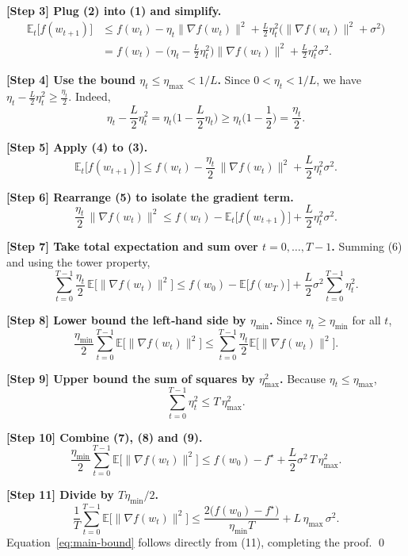 \documentclass[11pt]{article}
\begin{document}
\noindent\textbf{[Step 3] Plug (2) into (1) and simplify.}
\[
\begin{aligned}
\mathbb{E}_t\!\big[f(w_{t+1})\big]
&\le f(w_t)-\eta_t\|\nabla f(w_t)\|^2
   +\frac{L}{2}\eta_t^2\big(\|\nabla f(w_t)\|^2+\sigma^2\big)\\[4pt]
&= f(w_t)-\Big(\eta_t-\frac{L}{2}\eta_t^2\Big)\|\nabla f(w_t)\|^2
   +\frac{L}{2}\eta_t^2\sigma^2 .
\end{aligned}
\tag{3}
\]

\noindent\textbf{[Step 4] Use the bound $\eta_t\le\eta_{\max}<1/L$.}  
Since $0<\eta_t<1/L$, we have $\eta_t-\frac{L}{2}\eta_t^2\ge\frac{\eta_t}{2}$.
Indeed,
\[
\eta_t-\frac{L}{2}\eta_t^2
= \eta_t\Big(1-\frac{L}{2}\eta_t\Big)
\ge \eta_t\Big(1-\frac{1}{2}\Big)=\frac{\eta_t}{2}.
\tag{4}
\]

\noindent\textbf{[Step 5] Apply (4) to (3).}
\[
\mathbb{E}_t\!\big[f(w_{t+1})\big]
\le f(w_t)-\frac{\eta_t}{2}\,\|\nabla f(w_t)\|^2
   +\frac{L}{2}\eta_t^2\sigma^2 .
\tag{5}
\]

\noindent\textbf{[Step 6] Rearrange (5) to isolate the gradient term.}
\[
\frac{\eta_t}{2}\,\|\nabla f(w_t)\|^2
\le f(w_t)-\mathbb{E}_t\!\big[f(w_{t+1})\big]
   +\frac{L}{2}\eta_t^2\sigma^2 .
\tag{6}
\]

\noindent\textbf{[Step 7] Take total expectation and sum over $t=0,\dots,T-1$.}
Summing (6) and using the tower property,
\[
\sum_{t=0}^{T-1}\frac{\eta_t}{2}\,
\mathbb{E}\!\big[\|\nabla f(w_t)\|^2\big]
\le f(w_0)-\mathbb{E}\!\big[f(w_T)\big]
   +\frac{L}{2}\sigma^2\sum_{t=0}^{T-1}\eta_t^2 .
\tag{7}
\]

\noindent\textbf{[Step 8] Lower bound the left‑hand side by $\eta_{\min}$.}  
Since $\eta_t\ge\eta_{\min}$ for all $t$,
\[
\frac{\eta_{\min}}{2}\sum_{t=0}^{T-1}
\mathbb{E}\!\big[\|\nabla f(w_t)\|^2\big]
\le \sum_{t=0}^{T-1}\frac{\eta_t}{2}
\mathbb{E}\!\big[\|\nabla f(w_t)\|^2\big].
\tag{8}
\]

\noindent\textbf{[Step 9] Upper bound the sum of squares by $\eta_{\max}^2$.}
Because $\eta_t\le\eta_{\max}$,
\[
\sum_{t=0}^{T-1}\eta_t^2 \le T\,\eta_{\max}^2 .
\tag{9}
\]

\noindent\textbf{[Step 10] Combine (7), (8) and (9).}
\[
\frac{\eta_{\min}}{2}\sum_{t=0}^{T-1}
\mathbb{E}\!\big[\|\nabla f(w_t)\|^2\big]
\le f(w_0)-f^\star
   +\frac{L}{2}\sigma^2\,T\,\eta_{\max}^2 .
\tag{10}
\]

\noindent\textbf{[Step 11] Divide by $T\eta_{\min}/2$.}
\[
\frac{1}{T}\sum_{t=0}^{T-1}
\mathbb{E}\!\big[\|\nabla f(w_t)\|^2\big]
\le \frac{2\big(f(w_0)-f^\star\big)}{\eta_{\min}T}
   + L\,\eta_{\max}\,\sigma^2 .
\tag{11}
\]
Equation~\eqref{eq:main-bound} follows directly from (11), completing the proof. \qed
\end{document}
